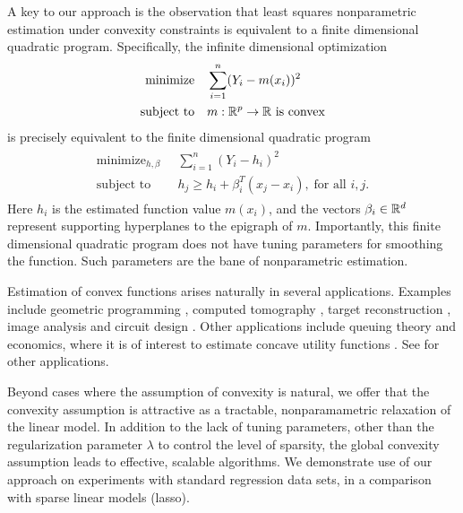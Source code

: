 A key to our approach is the observation that least squares
nonparametric estimation under convexity constraints is equivalent to
a finite dimensional quadratic program.  Specifically, the infinite
dimensional optimization 
\begin{align}
\begin{split}
\text{minimize} & \quad \sum_{i=1}^n (Y_i - m(x_i))^2 \\
\text{subject to} &  \quad m:{\mathbb R}^p\rightarrow{\mathbb R}\ \text{is
  convex}
\end{split}
\end{align}
is precisely equivalent to the finite dimensional quadratic
program 
\begin{align}
\begin{split}
\label{eq:outer}
\text{minimize}_{h, \beta} & \;\; \sum_{i=1}^n (Y_i - h_i)^2 \\
\text{subject to} & \;\; h_j \geq h_i + \beta_i^T (x_j-x_i),\; \text{for
    all $i,j$}.
\end{split}
\end{align}
Here $h_i$ is the estimated function value $m(x_i)$, and the vectors
$\beta_i \in {\mathbb R}^d$ represent supporting hyperplanes to the
epigraph of $m$.  Importantly, this finite dimensional quadratic program does
not have tuning parameters for smoothing the function. Such parameters are the bane
of nonparametric estimation.

Estimation of convex functions arises naturally in several
applications.  Examples include geometric programming \cite{Boyd04},
computed tomography \cite{Prince:90}, target reconstruction
\cite{Lele:92}, image analysis \cite{Golden:06} and circuit design
\cite{Hannah:12}.  Other applications include queuing theory
\cite{Chen:01} and economics, where it is of interest to estimate
concave utility functions \cite{Pratt:68}.  See \cite{Lim:12} for
other applications.  

Beyond cases where the assumption of convexity is
natural, we offer that the convexity assumption is attractive as a
tractable, nonparamametric relaxation of the linear model.  In
addition to the lack of tuning parameters, other than the
regularization parameter $\lambda$ to control the level of sparsity,
the global convexity assumption leads to effective, scalable algorithms.  We
demonstrate use of our approach on experiments with standard
regression data sets, in a comparison with sparse linear models
(lasso).


\def\mathbf#1{\mbox{\boldmath $#1$}} 





